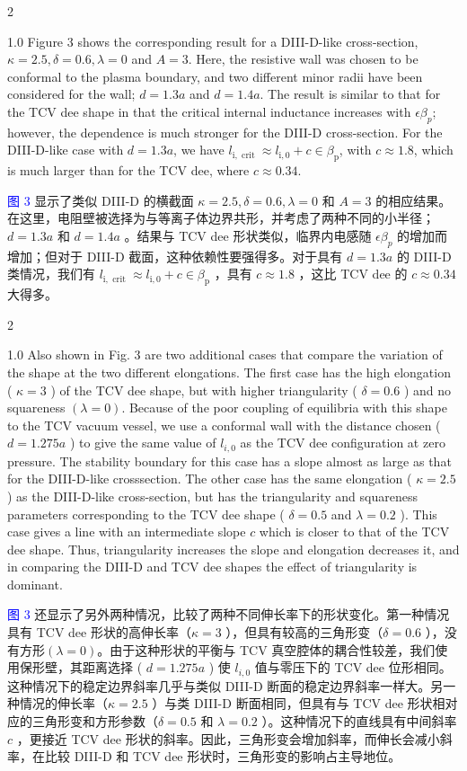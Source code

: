 \documentclass[utf8]{ctexart}
\newcommand\enzhbox[2]{
  	\quad\par \begin{paracol}{2} \colseprulecolor{black} 
  		\begin{spacing}{1.0}
  			\footnotesize  #1
  		\end{spacing}
  		\switchcolumn[1] 
  		#2
  	\end{paracol} \quad\par
  }
\begin{document}
\begin{sloppypar}
  
 
\enzhbox{  Figure 3 shows the corresponding result for a DIII-D-like cross-section, $\kappa=2.5, \delta=0.6, \lambda=0$ and $A=3$. Here, the resistive wall was chosen to be conformal to the plasma boundary, and two different minor radii have been considered for the wall; $d=1.3 a$ and $d=1.4 a$. The result is similar to that for the TCV dee shape in that the critical internal inductance increases with $\epsilon \beta_{p}$; however, the dependence is much stronger for the DIII-D cross-section. For the DIII-D-like case with $d=1.3 a$, we have $l_{\mathrm{i}, \text { crit }} \approx l_{\mathrm{i}, 0}+c \in \beta_{\mathrm{p}}$, with $c \approx 1.8$, which is much larger than for the TCV dee, where $c \approx 0.34$.}{
\textcolor{blue}{图 3} 显示了类似 DIII-D 的横截面 $\kappa=2.5, \delta=0.6, \lambda=0$  和 $A=3$ 的相应结果。在这里，电阻壁被选择为与等离子体边界共形，并考虑了两种不同的小半径；$d=1.3 a$  和 $d=1.4 a$ 。结果与 TCV dee 形状类似，临界内电感随 $\epsilon \beta_{p}$ 的增加而增加；但对于 DIII-D 截面，这种依赖性要强得多。对于具有 $d=1.3 a$ 的 DIII-D 类情况，我们有 $l_{\mathrm{i}, \text { crit }} \approx l_{\mathrm{i}, 0}+c \in \beta_{\mathrm{p}}$ ，具有 $c \approx 1.8$ ，这比 TCV dee 的 $c \approx 0.34$ 大得多。}
  
 
\enzhbox{  Also shown in Fig. 3 are two additional cases that compare the variation of the shape at the two different elongations. The first case has the high elongation ( $\kappa=3$ ) of the TCV dee shape, but with higher triangularity ( $\delta=0.6$ ) and no squareness $(\lambda=0)$. Because of the poor coupling of equilibria with this shape to the TCV vacuum vessel, we use a conformal wall with the distance chosen ( $d=1.275 a$ ) to give the same value of $l_{i, 0}$ as the TCV dee configuration at zero pressure. The stability boundary for this case has a slope almost as large as that for the DIII-D-like crosssection. The other case has the same elongation ( $\kappa=2.5$ ) as the DIII-D-like cross-section, but has the triangularity and squareness parameters corresponding to the TCV dee shape ( $\delta=0.5$ and $\lambda=0.2$ ). This case gives a line with an intermediate slope $c$ which is closer to that of the TCV dee shape. Thus, triangularity increases the slope and elongation decreases it, and in comparing the DIII-D and TCV dee shapes the effect of triangularity is dominant.}{
\textcolor{blue}{图 3} 还显示了另外两种情况，比较了两种不同伸长率下的形状变化。第一种情况具有 TCV dee 形状的高伸长率（$\kappa=3$ ），但具有较高的三角形变（$\delta=0.6$ ），没有方形$(\lambda=0)$。由于这种形状的平衡与 TCV 真空腔体的耦合性较差，我们使用保形壁，其距离选择 ( $d=1.275 a$  ) 使 $l_{i, 0}$  值与零压下的 TCV dee 位形相同。这种情况下的稳定边界斜率几乎与类似 DIII-D 断面的稳定边界斜率一样大。另一种情况的伸长率（$\kappa=2.5$  ）与类 DIII-D 断面相同，但具有与 TCV dee 形状相对应的三角形变和方形参数（$\delta=0.5$  和 $\lambda=0.2$  ）。这种情况下的直线具有中间斜率$c$ ，更接近 TCV dee 形状的斜率。因此，三角形变会增加斜率，而伸长会减小斜率，在比较 DIII-D 和 TCV dee 形状时，三角形变的影响占主导地位。}
  

\end{sloppypar}
\end{document}
